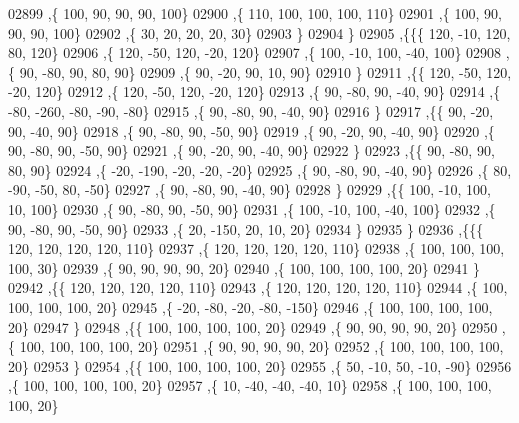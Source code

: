 \begin{DoxyCode}
02899     ,\{   100,    90,    90,    90,   100\}
02900     ,\{   110,   100,   100,   100,   110\}
02901     ,\{   100,    90,    90,    90,   100\}
02902     ,\{    30,    20,    20,    20,    30\}
02903     \}
02904    \}
02905   ,\{\{\{   120,   -10,   120,    80,   120\}
02906     ,\{   120,   -50,   120,   -20,   120\}
02907     ,\{   100,   -10,   100,   -40,   100\}
02908     ,\{    90,   -80,    90,    80,    90\}
02909     ,\{    90,   -20,    90,    10,    90\}
02910     \}
02911    ,\{\{   120,   -50,   120,   -20,   120\}
02912     ,\{   120,   -50,   120,   -20,   120\}
02913     ,\{    90,   -80,    90,   -40,    90\}
02914     ,\{   -80,  -260,   -80,   -90,   -80\}
02915     ,\{    90,   -80,    90,   -40,    90\}
02916     \}
02917    ,\{\{    90,   -20,    90,   -40,    90\}
02918     ,\{    90,   -80,    90,   -50,    90\}
02919     ,\{    90,   -20,    90,   -40,    90\}
02920     ,\{    90,   -80,    90,   -50,    90\}
02921     ,\{    90,   -20,    90,   -40,    90\}
02922     \}
02923    ,\{\{    90,   -80,    90,    80,    90\}
02924     ,\{   -20,  -190,   -20,   -20,   -20\}
02925     ,\{    90,   -80,    90,   -40,    90\}
02926     ,\{    80,   -90,   -50,    80,   -50\}
02927     ,\{    90,   -80,    90,   -40,    90\}
02928     \}
02929    ,\{\{   100,   -10,   100,    10,   100\}
02930     ,\{    90,   -80,    90,   -50,    90\}
02931     ,\{   100,   -10,   100,   -40,   100\}
02932     ,\{    90,   -80,    90,   -50,    90\}
02933     ,\{    20,  -150,    20,    10,    20\}
02934     \}
02935    \}
02936   ,\{\{\{   120,   120,   120,   120,   110\}
02937     ,\{   120,   120,   120,   120,   110\}
02938     ,\{   100,   100,   100,   100,    30\}
02939     ,\{    90,    90,    90,    90,    20\}
02940     ,\{   100,   100,   100,   100,    20\}
02941     \}
02942    ,\{\{   120,   120,   120,   120,   110\}
02943     ,\{   120,   120,   120,   120,   110\}
02944     ,\{   100,   100,   100,   100,    20\}
02945     ,\{   -20,   -80,   -20,   -80,  -150\}
02946     ,\{   100,   100,   100,   100,    20\}
02947     \}
02948    ,\{\{   100,   100,   100,   100,    20\}
02949     ,\{    90,    90,    90,    90,    20\}
02950     ,\{   100,   100,   100,   100,    20\}
02951     ,\{    90,    90,    90,    90,    20\}
02952     ,\{   100,   100,   100,   100,    20\}
02953     \}
02954    ,\{\{   100,   100,   100,   100,    20\}
02955     ,\{    50,   -10,    50,   -10,   -90\}
02956     ,\{   100,   100,   100,   100,    20\}
02957     ,\{    10,   -40,   -40,   -40,    10\}
02958     ,\{   100,   100,   100,   100,    20\}

\end{DoxyCode}
